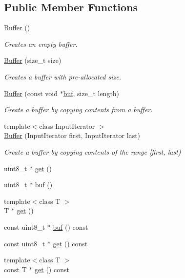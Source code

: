 \subsection*{Public Member Functions}
\begin{DoxyCompactItemize}
\item 
\hyperlink{classndn_1_1Buffer_a2e05abfbf750c97be0c2344141b5e78a}{Buffer} ()\hypertarget{classndn_1_1Buffer_a2e05abfbf750c97be0c2344141b5e78a}{}\label{classndn_1_1Buffer_a2e05abfbf750c97be0c2344141b5e78a}

\begin{DoxyCompactList}\small\item\em Creates an empty buffer. \end{DoxyCompactList}\item 
\hyperlink{classndn_1_1Buffer_a99cbbba739a3c10a8fddc6f2d88fb4cb}{Buffer} (size\+\_\+t size)
\begin{DoxyCompactList}\small\item\em Creates a buffer with pre-\/allocated size. \end{DoxyCompactList}\item 
\hyperlink{classndn_1_1Buffer_a897defbbc0912696b01ce0b548c76640}{Buffer} (const void $\ast$\hyperlink{classndn_1_1Buffer_a1ab623bc5bc99475676e42ff7b41a0f4}{buf}, size\+\_\+t length)
\begin{DoxyCompactList}\small\item\em Create a buffer by copying contents from a buffer. \end{DoxyCompactList}\item 
{\footnotesize template$<$class Input\+Iterator $>$ }\\\hyperlink{classndn_1_1Buffer_a53a3d3ca890b30a3473b329021f9e781}{Buffer} (Input\+Iterator first, Input\+Iterator last)
\begin{DoxyCompactList}\small\item\em Create a buffer by copying contents of the range \mbox{[}first, last) \end{DoxyCompactList}\item 
uint8\+\_\+t $\ast$ \hyperlink{classndn_1_1Buffer_a15dcf9049676ec26a3570ce0cb21e5b6}{get} ()
\item 
uint8\+\_\+t $\ast$ \hyperlink{classndn_1_1Buffer_a1ab623bc5bc99475676e42ff7b41a0f4}{buf} ()
\item 
{\footnotesize template$<$class T $>$ }\\T $\ast$ \hyperlink{classndn_1_1Buffer_a0b721a8f9e86dc47deee4b18e3986dd5}{get} ()
\item 
const uint8\+\_\+t $\ast$ \hyperlink{classndn_1_1Buffer_abd2a90e0561de52dfabed4e4f2c77974}{buf} () const
\item 
const uint8\+\_\+t $\ast$ \hyperlink{classndn_1_1Buffer_a79a3a566f4d134beb9254442e4aa54e6}{get} () const
\item 
{\footnotesize template$<$class T $>$ }\\const T $\ast$ \hyperlink{classndn_1_1Buffer_add466a0b04c34299e2b4b003f7d71a0f}{get} () const
\end{DoxyCompactItemize}


